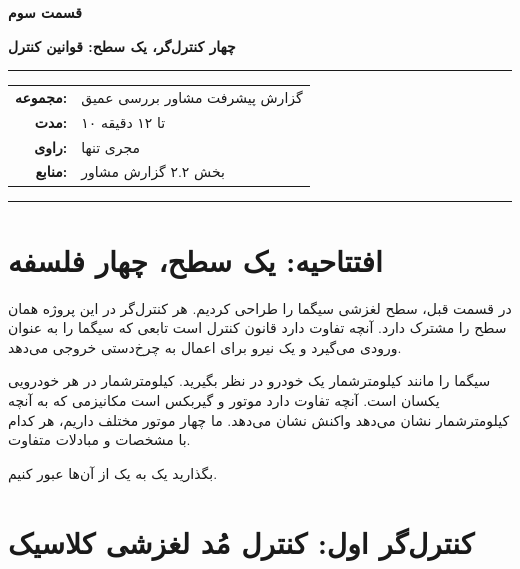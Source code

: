 \documentclass[12pt, a4paper]{article}
\newcommand{\dash}{\lr{---}}
\begin{document}

\thispagestyle{empty}

\vspace*{1.2cm}

{\centering
{\color{seriesblue}\fontsize{24}{30}\selectfont\bfseries قسمت سوم}

\vspace{0.5cm}
{\fontsize{15}{20}\selectfont\bfseries چهار کنترل‌گر، يک سطح: قوانين کنترل}

\vspace{0.9cm}
{\color{seriesblue}\rule{0.55\linewidth}{1pt}}
\vspace{0.7cm}

{\normalsize
\begin{tabular}{rl}
  \textbf{مجموعه:}     & گزارش پيشرفت مشاور \dash{} بررسی عمیق \\[5pt]
  \textbf{مدت:}        & ۱۰ تا ۱۲ دقیقه \\[5pt]
  \textbf{راوی:}       & مجری تنها \\[5pt]
  \textbf{منابع:}      & بخش ۲.۲ گزارش مشاور \\
\end{tabular}
}

\vspace{0.9cm}
{\color{seriesblue}\rule{0.55\linewidth}{0.4pt}}
\par}

\vspace{1.2cm}

\section{افتتاحیه: يک سطح، چهار فلسفه}

در قسمت قبل، سطح لغزشی سيگما را طراحی کرديم. هر کنترل‌گر در اين پروژه همان سطح را مشترک دارد. آنچه تفاوت دارد قانون کنترل است \dash{} تابعی که سيگما را به عنوان ورودی می‌گيرد و يک نيرو برای اعمال به چرخ‌دستی خروجی می‌دهد.

سيگما را مانند کيلومترشمار يک خودرو در نظر بگيريد. کيلومترشمار در هر خودرويی يکسان است. آنچه تفاوت دارد موتور و گيربکس است \dash{} مکانيزمی که به آنچه کيلومترشمار نشان می‌دهد واکنش نشان می‌دهد. ما چهار موتور مختلف داريم، هر کدام با مشخصات و مبادلات متفاوت.

بگذاريد يک به يک از آن‌ها عبور کنيم.

\section{کنترل‌گر اول: کنترل مُد لغزشی کلاسيک}
\end{document}
